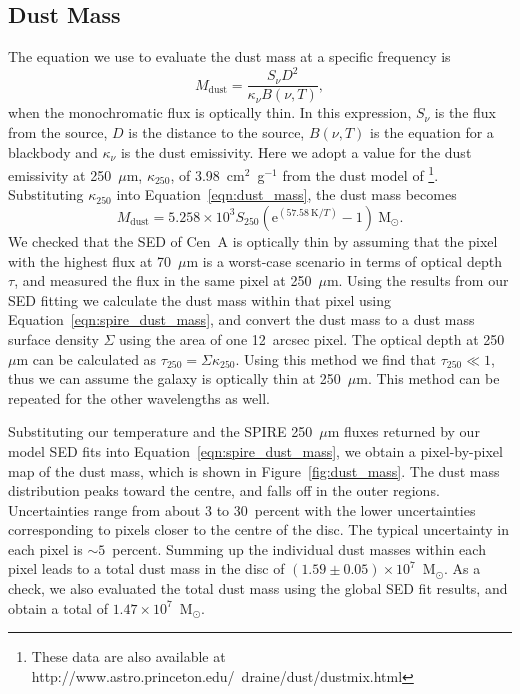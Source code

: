\subsection{Dust Mass}\label{subsec:dust}
The equation we use to evaluate the dust mass at a specific frequency is
\begin{equation}\label{eqn:dust_mass}
 M_{\mathrm{dust}} = \frac{S_{\nu}D^{2}}{\kappa_{\nu} B(\nu,T)},
\end{equation}
when the monochromatic flux is optically thin.  In this expression, $S_{\nu}$ is the flux from the source, $D$ is the distance to the source, $B(\nu,T)$ is the equation for a blackbody and $\kappa_{\nu}$ is the dust emissivity.  Here we adopt a value for the dust emissivity at 250~$\mu$m, $\kappa_{250}$, of 3.98~cm$^{2}$~g$^{-1}$ from the dust model of \citet{2003ARA&A..41..241D}\footnote{These data are also available at \newline http://www.astro.princeton.edu/~draine/dust/dustmix.html}.  Substituting $\kappa_{250}$ into Equation~\ref{eqn:dust_mass}, the dust mass becomes
\begin{equation}\label{eqn:spire_dust_mass}
 M_{\mathrm{dust}} = 5.258 \times 10^{3}S_{250}\left(\mathrm{e}^{(57.58~\mathrm{K}/T)}-1\right) ~\mathrm{M}_{\odot}.
\end{equation}
We checked that the SED of Cen~A is optically thin by assuming that the pixel with the highest flux at 70~$\mu$m is a worst-case scenario in terms of optical depth $\tau$, and measured the flux in the same pixel at 250~$\mu$m.  Using the results from our SED fitting we calculate the dust mass within that pixel using Equation~\ref{eqn:spire_dust_mass}, and convert the dust mass to a dust mass surface density $\Sigma$ using the area of one 12~arcsec pixel. The optical depth at 250~$\mu$m can be calculated as $\tau_{250} = \Sigma \kappa_{250}$.  Using this method we find that $\tau_{250} \ll 1$, thus we can assume the galaxy is optically thin at 250~$\mu$m.  This method can be repeated for the other wavelengths as well.

Substituting our temperature and the SPIRE 250~$\mu$m fluxes returned by our model SED fits into Equation~\ref{eqn:spire_dust_mass}, we obtain a  pixel-by-pixel map of the dust mass, which is shown in Figure~\ref{fig:dust_mass}.  The dust mass distribution peaks toward the centre, and falls off in the outer regions.  Uncertainties range from about 3 to 30~percent with the lower uncertainties corresponding to pixels closer to the centre of the disc.  The typical uncertainty in each pixel is $\sim 5$~percent.  Summing up the individual dust masses within each pixel leads to a total dust mass in the disc of $(1.59 \pm 0.05) \times 10^{7}$~M$_{\odot}$.  As a check, we also evaluated the total dust mass using the global SED fit results, and obtain a total of $1.47 \times 10^{7}$~M$_{\odot}$.

